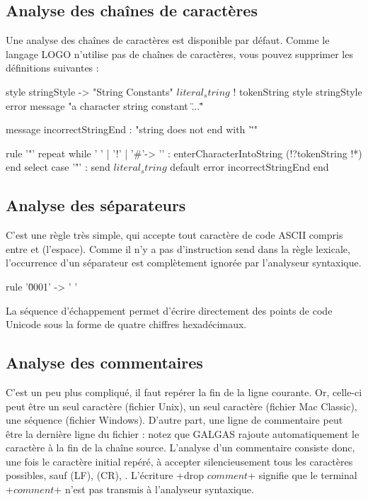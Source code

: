 \subsection{Analyse des chaînes de caractères}
Une analyse des chaînes de caractères est disponible par défaut. Comme le langage LOGO n’utilise pas de chaînes de caractères, vous pouvez supprimer les définitions suivantes :

\begin{galgas}
style stringStyle -> "String Constants"
$literal_string$ ! tokenString style stringStyle %
                   error message "a character string constant \"...\""

message incorrectStringEnd : "string does not end with '\"'"

rule '"' {
  repeat
  while ' ' | '!' | '#'-> '\uFFFD' :
    enterCharacterIntoString (!?tokenString !*)
  end
  select
  case '"' :
    send $literal_string$
  default
    error incorrectStringEnd
  end
}
\end{galgas}

\subsection{Analyse des séparateurs}
C'est une règle très simple, qui accepte tout caractère de code ASCII compris entre  et  (l'espace). Comme il n'y a pas d'instruction send dans la règle lexicale, l'occurrence d'un séparateur est complètement ignorée par l'analyseur syntaxique.
\begin{galgas}
rule '\u0001' -> ' ' {
}
\end{galgas}
La séquence d'échappement  permet d'écrire directement des points de code Unicode sous la forme de quatre chiffres hexadécimaux.

\subsection{Analyse des commentaires}
C'est un peu plus compliqué, il faut repérer la fin de la ligne courante. Or, celle-ci peut être un seul caractère  (fichier Unix), un seul caractère  (fichier Mac Classic), une séquence  (fichier Windows). D'autre part, une ligne de commentaire peut être la dernière ligne du fichier : notez que GALGAS rajoute automatiquement le caractère \tpp{\textquotesingle\textbackslash 0\textquotesingle} à la fin de la chaîne source. L'analyse d'un commentaire consiste donc, une fois le caractère initial \tpp{\textquotesingle\textbackslash\#\textquotesingle} repéré, à accepter silencieusement tous les caractères possibles, sauf  (LF),  (CR), . L’écriture \ggs+drop $comment$+ signifie que le terminal \ggs+$comment$+ n’est pas transmis à l’analyseur syntaxique.

